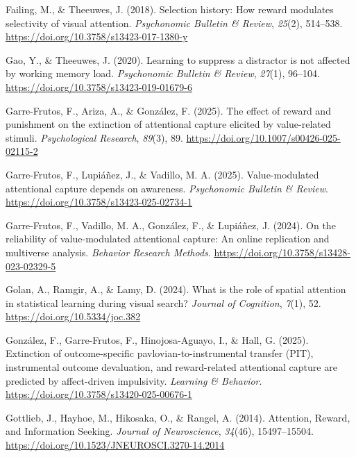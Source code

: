 \documentclass[
  man,
  floatsintext,
  longtable,
  nolmodern,
  notxfonts,
  notimes,
  mask,
  colorlinks=true,linkcolor=blue,citecolor=blue,urlcolor=blue]{apa7}
\newlength{\cslhangindent}
\newenvironment{CSLReferences}[2] %
 {\begin{list}{}{%
  \setlength{\itemindent}{0pt}
  \setlength{\leftmargin}{0pt}
  \setlength{\parsep}{0pt}
  \ifodd #1
   \setlength{\leftmargin}{\cslhangindent}
   \setlength{\itemindent}{-1\cslhangindent}
  \fi
  \setlength{\itemsep}{#2\baselineskip}}}
 {\end{list}}
\begin{document}
\begin{CSLReferences}{1}{0}
Failing, M., \& Theeuwes, J. (2018). Selection history: How reward
modulates selectivity of visual attention. \emph{Psychonomic Bulletin \&
Review}, \emph{25}(2), 514--538.
\url{https://doi.org/10.3758/s13423-017-1380-y}

Gao, Y., \& Theeuwes, J. (2020). Learning to suppress a distractor is
not affected by working memory load. \emph{Psychonomic Bulletin \&
Review}, \emph{27}(1), 96--104.
\url{https://doi.org/10.3758/s13423-019-01679-6}

Garre-Frutos, F., Ariza, A., \& González, F. (2025). The effect of
reward and punishment on the extinction of attentional capture elicited
by value-related stimuli. \emph{Psychological Research}, \emph{89}(3),
89. \url{https://doi.org/10.1007/s00426-025-02115-2}

Garre-Frutos, F., Lupiáñez, J., \& Vadillo, M. A. (2025).
Value-modulated attentional capture depends on awareness.
\emph{Psychonomic Bulletin \& Review}.
\url{https://doi.org/10.3758/s13423-025-02734-1}

Garre-Frutos, F., Vadillo, M. A., González, F., \& Lupiáñez, J. (2024).
On the reliability of value-modulated attentional capture: An online
replication and multiverse analysis. \emph{Behavior Research Methods}.
\url{https://doi.org/10.3758/s13428-023-02329-5}

Golan, A., Ramgir, A., \& Lamy, D. (2024). What is the role of spatial
attention in statistical learning during visual search? \emph{Journal of
Cognition}, \emph{7}(1), 52. \url{https://doi.org/10.5334/joc.382}

González, F., Garre-Frutos, F., Hinojosa-Aguayo, I., \& Hall, G. (2025).
Extinction of outcome-specific pavlovian-to-instrumental transfer (PIT),
instrumental outcome devaluation, and reward-related attentional capture
are predicted by affect-driven impulsivity. \emph{Learning \& Behavior}.
\url{https://doi.org/10.3758/s13420-025-00676-1}

Gottlieb, J., Hayhoe, M., Hikosaka, O., \& Rangel, A. (2014). Attention,
Reward, and Information Seeking. \emph{Journal of Neuroscience},
\emph{34}(46), 15497--15504.
\url{https://doi.org/10.1523/JNEUROSCI.3270-14.2014}


\end{CSLReferences}
\end{document}
